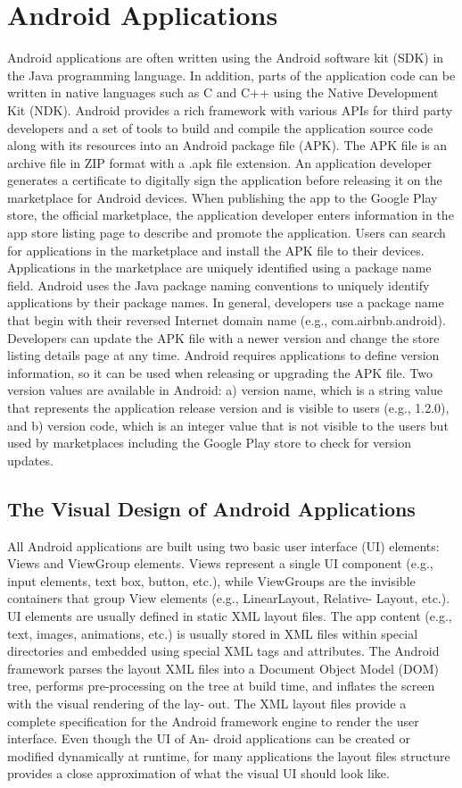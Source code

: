 \section{Android Applications}
Android applications are often written using the Android software kit (SDK) in the Java programming language.
In addition, parts of the application code can be written in native languages such as C and C++ using the Native Development Kit (NDK).
Android provides a rich framework with various APIs for third party developers and a set of tools to build and compile the application source code along with its resources into an Android package file (APK).
The APK file is an archive file in ZIP format with a .apk file extension.
An application developer generates a certificate to digitally sign the application before releasing it on the marketplace for Android devices.
When publishing the app to the Google Play store, the official marketplace, the application developer enters information in the app store listing page to describe and promote the application.
Users can search for applications in the marketplace and install the APK file to their devices.
Applications in the marketplace are uniquely identified using a package name field.
Android uses the Java package naming conventions to uniquely identify applications by their package names.
In general, developers use a package name that begin with their reversed Internet domain name (e.g., com.airbnb.android).
Developers can update the APK file with a newer version and change the store listing details page at any time.
Android requires applications to define version information, so it can be used when releasing or upgrading the APK file.
Two version values are available in Android: a) version name, which is a string value that represents the application release version and is visible to users (e.g., 1.2.0), and b) version code, which is an integer value that is not visible to the users but used by marketplaces including the Google Play store to check for version updates.

\subsection{The Visual Design of Android Applications}
All Android applications are built using two basic user interface (UI) elements: Views and ViewGroup elements. Views represent a single UI component (e.g., input elements, text box, button, etc.), while ViewGroups are the invisible containers that group View elements (e.g., LinearLayout, Relative- Layout, etc.). UI elements are usually defined in static XML layout files. The app content (e.g., text, images, animations, etc.) is usually stored in XML files within special directories and embedded using special XML tags and attributes. The Android framework parses the layout XML files into a Document Object Model (DOM) tree, performs pre-processing on the tree at build time, and inflates the screen with the visual rendering of the lay- out. The XML layout files provide a complete specification for the Android framework engine to render the user interface. Even though the UI of An- droid applications can be created or modified dynamically at runtime, for many applications the layout files structure provides a close approximation of what the visual UI should look like.